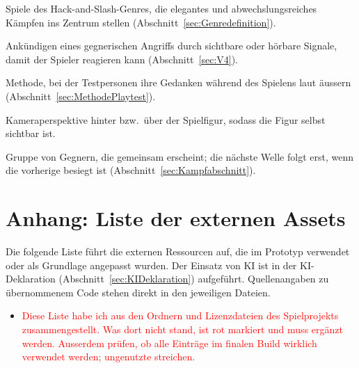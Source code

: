 \documentclass[../Main.tex]{subfiles}
\begin{document}
\begin{description}[style=unboxed, leftmargin=0cm, itemsep=0.3em]
\item[Stylish-Action] Spiele des Hack-and-Slash-Genres, die elegantes und abwechslungsreiches Kämpfen ins Zentrum stellen (Abschnitt~\ref{sec:Genredefinition}).
\item[Telegrafieren] Ankündigen eines gegnerischen Angriffs durch sichtbare oder hörbare Signale, damit der Spieler reagieren kann (Abschnitt~\ref{sec:V4}).
\item[Think-aloud] Methode, bei der Testpersonen ihre Gedanken während des Spielens laut äussern (Abschnitt~\ref{sec:MethodePlaytest}).
\item[Third-Person-Perspektive] Kameraperspektive hinter bzw.\ über der Spielfigur, sodass die Figur selbst sichtbar ist.
\item[Welle] Gruppe von Gegnern, die gemeinsam erscheint; die nächste Welle folgt erst, wenn die vorherige besiegt ist (Abschnitt~\ref{sec:Kampfabschnitt}).
\end{description}

\newpage
\section{Anhang: Liste der externen Assets} \label{sec:Assets}

Die folgende Liste führt die externen Ressourcen auf, die im Prototyp verwendet oder als Grundlage angepasst wurden. Der Einsatz von KI ist in der KI-Deklaration (Abschnitt~\ref{sec:KIDeklaration}) aufgeführt. Quellenangaben zu übernommenem Code stehen direkt in den jeweiligen Dateien.

\begin{itemize}[leftmargin=1.5cm]
\item \textcolor{red}{Diese Liste habe ich aus den Ordnern und Lizenzdateien des Spielprojekts zusammengestellt. Was dort nicht stand, ist rot markiert und muss ergänzt werden. Ausserdem prüfen, ob alle Einträge im finalen Build wirklich verwendet werden; ungenutzte streichen.}
\end{itemize}
\end{document}
